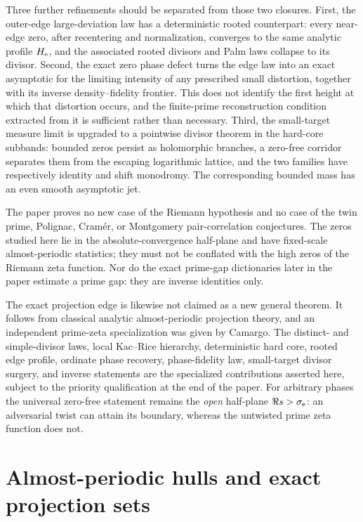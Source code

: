 \documentclass[11pt]{article}
\theoremstyle{definition}
\theoremstyle{remark}
\begin{document}
Three further refinements should be separated from those two closures.  First,
the outer-edge large-deviation law has a deterministic rooted counterpart:
every near-edge zero, after recentering and normalization, converges to the
same analytic profile $H_{\rm e}$, and the associated rooted divisors and Palm
laws collapse to its divisor.  Second, the exact zero phase defect turns the
edge law into an exact asymptotic for the limiting intensity of any prescribed
small distortion, together with its inverse density--fidelity frontier.  This
does not identify the first height at which that distortion occurs, and the
finite-prime reconstruction condition extracted from it is sufficient rather
than necessary.  Third, the small-target measure limit is upgraded to a
pointwise divisor theorem in the hard-core subbands: bounded zeros persist as
holomorphic branches, a zero-free corridor separates them from the escaping
logarithmic lattice, and the two families have respectively identity and
shift monodromy.  The corresponding bounded mass has an even smooth
asymptotic jet.

The paper proves no new case of the Riemann hypothesis and no case of the twin
prime, Polignac, Cram\'er, or Montgomery pair-correlation conjectures.  The zeros
studied here lie in the absolute-convergence half-plane and have fixed-scale
almost-periodic statistics; they must not be conflated with the high zeros of
the Riemann zeta function.  Nor do the exact prime-gap dictionaries later in the
paper estimate a prime gap: they are inverse identities only.

The exact projection edge is likewise not claimed as a new general theorem.
It follows from classical analytic almost-periodic projection theory, and an
independent prime-zeta specialization was given by Camargo.  The distinct- and
simple-divisor laws, local Kac--Rice hierarchy, deterministic hard core,
rooted edge profile, ordinate phase recovery, phase-fidelity law, small-target
divisor surgery, and inverse statements are the specialized contributions
asserted here, subject to the priority qualification at the end of the paper.
For arbitrary phases the universal zero-free statement remains the
\emph{open} half-plane $\Re s>\sigma_{\rm e}$: an adversarial twist can attain
its boundary, whereas the untwisted prime zeta function does not.

\section{Almost-periodic hulls and exact projection sets}
\label{sec:hulls}
\end{document}
